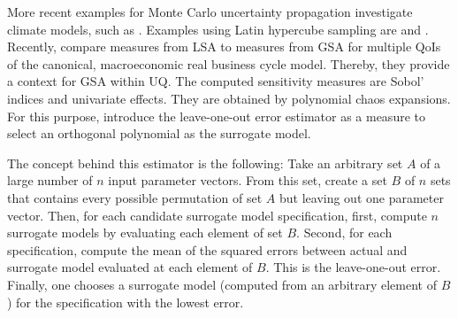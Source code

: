 \newline
More recent examples for Monte Carlo uncertainty propagation investigate climate models, such as \cite{Webster.2012}.
Examples using Latin hypercube sampling are \cite{Mattoo.2009} and \cite{Hope.2006}.\\
\newline
Recently, \cite{Harenberg.2019} compare measures from LSA to measures from GSA for multiple QoIs of the canonical, macroeconomic real business cycle model. Thereby, they provide a context for GSA within UQ. The computed sensitivity measures are Sobol' indices and univariate effects. They are obtained by polynomial chaos expansions. For this purpose, \citeauthor{Harenberg.2019} introduce the leave-one-out error estimator as a measure to select an orthogonal polynomial as the surrogate model.

The concept behind this estimator is the following: Take an arbitrary set $A$ of a large number of $n$ input parameter vectors. From this set, create a set $B$ of $n$ sets that contains every possible permutation of set $A$ but leaving out one parameter vector. Then, for each candidate surrogate model specification, first, compute $n$ surrogate models by evaluating each element of set $B$. Second, for each specification, compute the mean of the squared errors between actual and surrogate model evaluated at each element of $B$. This is the leave-one-out error. Finally, one chooses a surrogate model (computed from an arbitrary element of $B$) for the specification with the lowest error.

